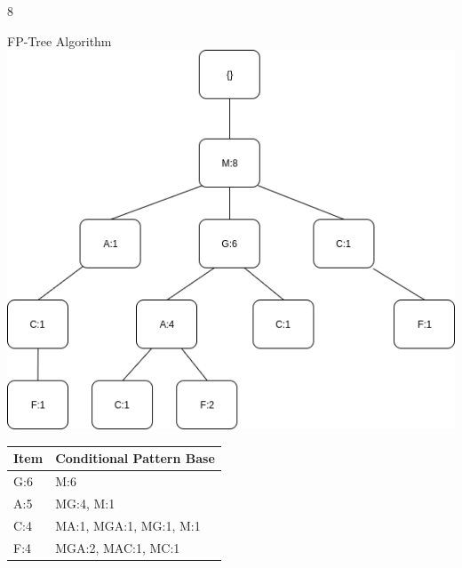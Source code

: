 \documentclass{article}
\begin{document}
\begin{ukon-infie}[10.01.18]{8}
\begin{exercise}[p=6]{FP-Tree Algorithm}
\includegraphics[scale=0.5]{FPtree.png}

		\question{}
		{
		\begin{tabular}{|l|l|}
\hline
Item & Conditional Pattern Base \\ \hline
G:6  & M:6                      \\ \hline
A:5  & MG:4, M:1                \\ \hline
C:4  & MA:1, MGA:1, MG:1, M:1   \\ \hline
F:4  & MGA:2, MAC:1, MC:1       \\ \hline
\end{tabular}
		}

		\end{exercise}
		

\end{ukon-infie}
\end{document}
